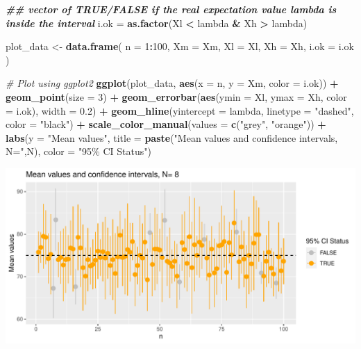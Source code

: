 \documentclass[
]{book}
\newenvironment{Shaded}{\begin{snugshade}}{\end{snugshade}}
\newcommand{\AttributeTok}[1]{\textcolor[rgb]{0.13,0.29,0.53}{#1}}
\newcommand{\CommentTok}[1]{\textcolor[rgb]{0.56,0.35,0.01}{\textit{#1}}}
\newcommand{\DecValTok}[1]{\textcolor[rgb]{0.00,0.00,0.81}{#1}}
\newcommand{\DocumentationTok}[1]{\textcolor[rgb]{0.56,0.35,0.01}{\textbf{\textit{#1}}}}
\newcommand{\FloatTok}[1]{\textcolor[rgb]{0.00,0.00,0.81}{#1}}
\newcommand{\FunctionTok}[1]{\textcolor[rgb]{0.13,0.29,0.53}{\textbf{#1}}}
\newcommand{\NormalTok}[1]{#1}
\newcommand{\OtherTok}[1]{\textcolor[rgb]{0.56,0.35,0.01}{#1}}
\newcommand{\SpecialCharTok}[1]{\textcolor[rgb]{0.81,0.36,0.00}{\textbf{#1}}}
\newcommand{\StringTok}[1]{\textcolor[rgb]{0.31,0.60,0.02}{#1}}
\begin{document}
\begin{Shaded}
\begin{Highlighting}[]
\DocumentationTok{\#\# vector of TRUE/FALSE if the real expectation value lambda is inside the interval}
\NormalTok{i.ok }\OtherTok{=}  \FunctionTok{as.factor}\NormalTok{(Xl }\SpecialCharTok{\textless{}}\NormalTok{ lambda }\SpecialCharTok{\&}\NormalTok{ Xh }\SpecialCharTok{\textgreater{}}\NormalTok{ lambda)}

\NormalTok{plot\_data }\OtherTok{\textless{}{-}} \FunctionTok{data.frame}\NormalTok{(}
  \AttributeTok{n =} \DecValTok{1}\SpecialCharTok{:}\DecValTok{100}\NormalTok{,}
  \AttributeTok{Xm =}\NormalTok{ Xm,}
  \AttributeTok{Xl =}\NormalTok{ Xl,}
  \AttributeTok{Xh =}\NormalTok{ Xh,}
  \AttributeTok{i.ok =}\NormalTok{ i.ok}
\NormalTok{) }

\CommentTok{\# Plot using ggplot2}
\FunctionTok{ggplot}\NormalTok{(plot\_data, }
       \FunctionTok{aes}\NormalTok{(}\AttributeTok{x =}\NormalTok{ n, }\AttributeTok{y =}\NormalTok{ Xm, }
           \AttributeTok{color =} \StringTok{\textasciigrave{}}\AttributeTok{i.ok}\StringTok{\textasciigrave{}}\NormalTok{)) }\SpecialCharTok{+}
  \FunctionTok{geom\_point}\NormalTok{(}\AttributeTok{size =} \DecValTok{3}\NormalTok{) }\SpecialCharTok{+}
  \FunctionTok{geom\_errorbar}\NormalTok{(}\FunctionTok{aes}\NormalTok{(}\AttributeTok{ymin =}\NormalTok{ Xl, }\AttributeTok{ymax =}\NormalTok{ Xh, }\AttributeTok{color =}\NormalTok{ i.ok), }\AttributeTok{width =} \FloatTok{0.2}\NormalTok{) }\SpecialCharTok{+}
  \FunctionTok{geom\_hline}\NormalTok{(}\AttributeTok{yintercept =}\NormalTok{ lambda, }\AttributeTok{linetype =} \StringTok{"dashed"}\NormalTok{, }\AttributeTok{color =} \StringTok{"black"}\NormalTok{) }\SpecialCharTok{+}
  \FunctionTok{scale\_color\_manual}\NormalTok{(}\AttributeTok{values =} \FunctionTok{c}\NormalTok{(}\StringTok{"grey"}\NormalTok{, }\StringTok{"orange"}\NormalTok{)) }\SpecialCharTok{+}
  \FunctionTok{labs}\NormalTok{(}\AttributeTok{y =} \StringTok{"Mean values"}\NormalTok{,}
       \AttributeTok{title =} \FunctionTok{paste}\NormalTok{(}\StringTok{"Mean values and confidence intervals, N="}\NormalTok{,N),}
       \AttributeTok{color =} \StringTok{"95\% CI Status"}\NormalTok{) }
\end{Highlighting}
\end{Shaded}

\includegraphics{_main_files/figure-latex/unnamed-chunk-114-1.pdf}
\end{document}
